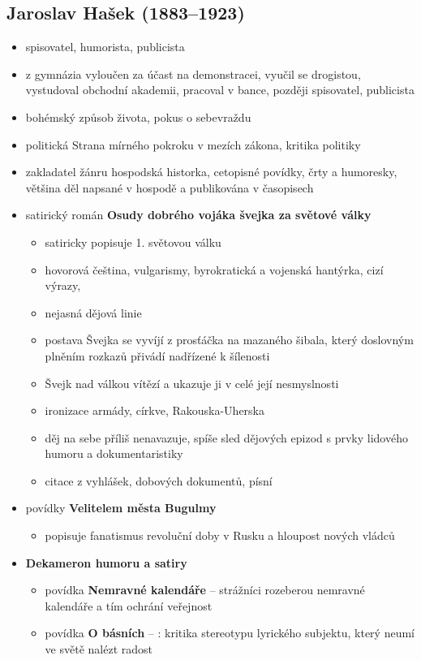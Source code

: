 \subsection{Jaroslav Hašek (1883--1923)}
\begin{itemize}
\item spisovatel, humorista, publicista
\item z gymnázia vyloučen za účast na demonstracei, vyučil se drogistou, vystudoval obchodní akademii, pracoval v bance, později spisovatel, publicista
\item bohémský způsob života, pokus o sebevraždu
\item politická Strana mírného pokroku v mezích zákona, kritika politiky
\item zakladatel žánru hospodská historka, cetopisné povídky, črty a humoresky, většina děl napsané v hospodě a publikována v časopisech
\item satirický román \textbf{Osudy dobrého vojáka švejka za světové války}
	\begin{itemize}
	\item satiricky popisuje 1. světovou válku
	\item hovorová čeština, vulgarismy, byrokratická a vojenská hantýrka, cizí výrazy, 
	\item nejasná dějová linie
	\item postava Švejka se vyvíjí z prosťáčka na mazaného šibala, který doslovným plněním rozkazů přivádí nadřízené k šílenosti
	\item Švejk nad válkou vítězí a ukazuje ji v celé její nesmyslnosti
	\item ironizace armády, církve, Rakouska-Uherska
	\item děj na sebe příliš nenavazuje, spíše sled dějových epizod s prvky lidového humoru a dokumentaristiky
	\item citace z vyhlášek, dobových dokumentů, písní
	\end{itemize}
\item povídky \textbf{Velitelem města Bugulmy}
	\begin{itemize}
	\item popisuje fanatismus revoluční doby v Rusku a hloupost nových vládců
	\end{itemize}
\item \textbf{Dekameron humoru a satiry}
	\begin{itemize}
	\item povídka \textbf{Nemravné kalendáře} -- strážníci rozeberou nemravné kalendáře a tím ochrání veřejnost

	\item povídka \textbf{O básních} -- : kritika stereotypu lyrického subjektu, který neumí ve světě nalézt radost
	\end{itemize}
\end{itemize}

